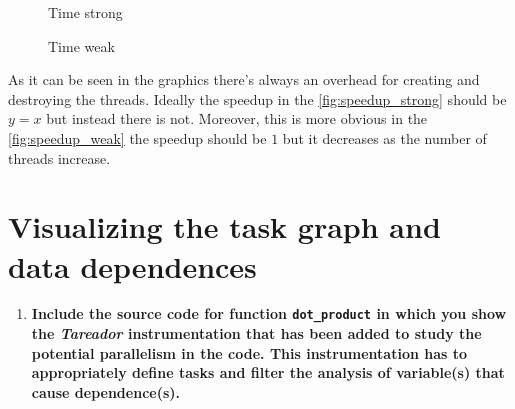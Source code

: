 \documentclass[a4paper]{article}
\begin{document}
\begin{figure}[H]
    \begin{minipage}[t]{0.49\linewidth}
        \caption{Time strong}
        \label{fig:time_strong}
    \end{minipage}
    \begin{minipage}[t]{0.49\linewidth}
        \caption{Time weak}
        \label{fig:time_weak}
    \end{minipage}
\end{figure}


As it can be seen in the graphics there's always an overhead for creating and destroying the threads. Ideally the speedup in the \autoref{fig:speedup_strong} should be $y = x$ but instead there is not. Moreover, this is more obvious in the \autoref{fig:speedup_weak} the speedup should be $1$ but it decreases as the number of threads increase.

\section*{Visualizing the task graph and data dependences}

\begin{enumerate}[resume]
	\item \textbf{Include the source code for function \texttt{dot\_product} in which you show the \textit{Tareador} instrumentation that has been added to study the potential parallelism in the code. This instrumentation has to appropriately define tasks and filter the analysis of variable(s) that cause dependence(s).}
\end{enumerate}

\end{document}
